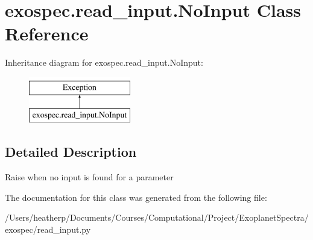 \hypertarget{classexospec_1_1read__input_1_1_no_input}{}\section{exospec.\+read\+\_\+input.\+No\+Input Class Reference}
\label{classexospec_1_1read__input_1_1_no_input}
Inheritance diagram for exospec.\+read\+\_\+input.\+No\+Input\+:\begin{figure}[H]
\begin{center}
\leavevmode
\includegraphics[height=2.000000cm]{classexospec_1_1read__input_1_1_no_input}
\end{center}
\end{figure}


\subsection{Detailed Description}
\begin{DoxyVerb}Raise when no input is found for a parameter\end{DoxyVerb}
 

The documentation for this class was generated from the following file\+:\begin{DoxyCompactItemize}
\item 
/\+Users/heatherp/\+Documents/\+Courses/\+Computational/\+Project/\+Exoplanet\+Spectra/exospec/read\+\_\+input.\+py\end{DoxyCompactItemize}
